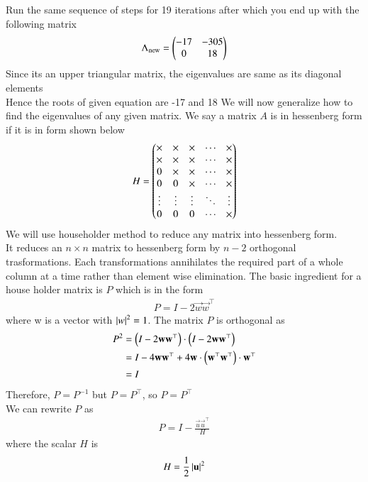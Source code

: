 \documentclass[journal]{IEEEtran}
\begin{document}
Run the same sequence of steps for 19 iterations after which you end up with the following matrix
\begin{align}
    \Lambda_{\text{new}} = \begin{pmatrix}-17&-305\\0&18\end{pmatrix}
\end{align}
Since its an upper triangular matrix, the eigenvalues are same as its diagonal elements\\
Hence the roots of given equation are -17 and 18\newline \newline
We will now generalize how to find the eigenvalues of any given matrix. We say a matrix $A$ is in hessenberg form if it is in form shown below
\begin{align}
H = 
\begin{pmatrix}
\times & \times & \times & \cdots & \times \\
\times & \times & \times & \cdots & \times \\
0      & \times & \times & \cdots & \times \\
0      & 0      & \times & \cdots & \times \\
\vdots & \vdots & \vdots & \ddots & \vdots \\
0      & 0      & 0      & \cdots & \times
\end{pmatrix}
\end{align}
We will use householder method to reduce any matrix into hessenberg form.\\
It reduces an $n\times n$ matrix to hessenberg form by $n-2$ orthogonal trasformations. Each transformations annihilates the required part of a whole column at a time rather than element wise elimination. The basic ingredient for a house holder matrix is $P$ which is in the form
\begin{align}
	P = I-2\vec{w}\vec{w}^\top
\end{align}
where w is a vector with $\left\vert w\right\vert^2=1$. The matrix $P$ is orthogonal as
\begin{align}
P^2 &=\left(I - 2\mathbf{w}\mathbf{w}^\top\right)\cdot\left(I - 2\mathbf{w}\mathbf{w}^\top\right)\\
    &=I-4\mathbf{w}\mathbf{w}^\top + 4\mathbf{w}\cdot\left(\mathbf{w}^\top\mathbf{w}^\top\right)\cdot\mathbf{w}^\top\\
    &=I
\end{align}
Therefore, $P=P^{-1}$ but $P = P^\top$, so $P = P^\top$ \\
We can rewrite $P$ as
\begin{align}
	P = I - \frac{\vec{u}\vec{u}^\top}{H}
\end{align}
where the scalar $H$ is
\begin{align}
H = \frac{1}{2}\left\vert\mathbf{u}\right\vert^2
\end{align}
\end{document}
